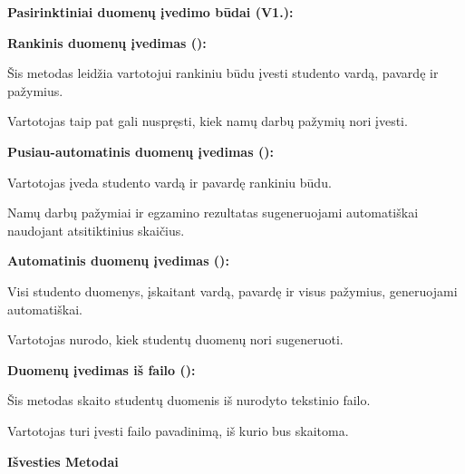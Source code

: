 

{\bfseries{Pasirinktiniai duomenų įvedimo būdai (V1.)\+:}}


\begin{DoxyItemize}
\item {\bfseries{Rankinis duomenų įvedimas ()\+:}}
\begin{DoxyItemize}
\item Šis metodas leidžia vartotojui rankiniu būdu įvesti studento vardą, pavardę ir pažymius.
\item Vartotojas taip pat gali nuspręsti, kiek namų darbų pažymių nori įvesti.
\end{DoxyItemize}
\item {\bfseries{Pusiau-\/automatinis duomenų įvedimas ()\+:}}
\begin{DoxyItemize}
\item Vartotojas įveda studento vardą ir pavardę rankiniu būdu.
\item Namų darbų pažymiai ir egzamino rezultatas sugeneruojami automatiškai naudojant atsitiktinius skaičius.
\end{DoxyItemize}
\item {\bfseries{Automatinis duomenų įvedimas ()\+:}}
\begin{DoxyItemize}
\item Visi studento duomenys, įskaitant vardą, pavardę ir visus pažymius, generuojami automatiškai.
\item Vartotojas nurodo, kiek studentų duomenų nori sugeneruoti.
\end{DoxyItemize}
\item {\bfseries{Duomenų įvedimas iš failo ()\+:}}
\begin{DoxyItemize}
\item Šis metodas skaito studentų duomenis iš nurodyto tekstinio failo.
\item Vartotojas turi įvesti failo pavadinimą, iš kurio bus skaitoma.
\end{DoxyItemize}
\end{DoxyItemize}

{\bfseries{Išvesties Metodai}}


